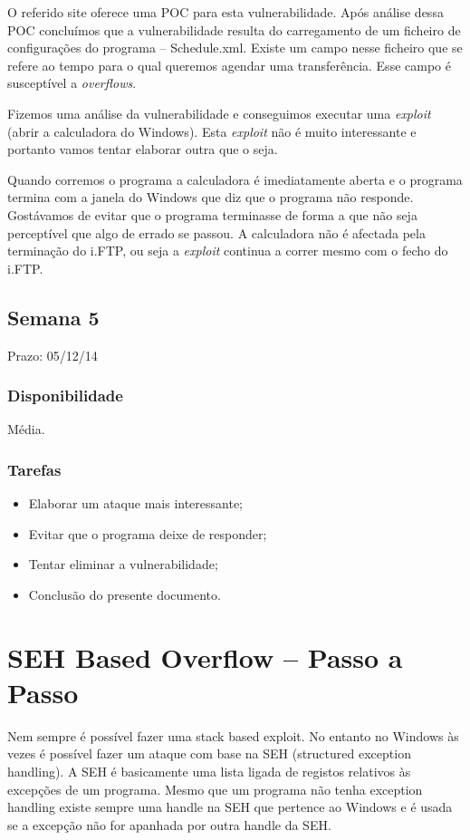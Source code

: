 \documentclass[a4paper]{article}
\begin{document}
O referido site oferece uma POC para esta vulnerabilidade. Após análise dessa POC concluímos que a vulnerabilidade resulta do carregamento de um ficheiro de configurações do programa -- Schedule.xml. Existe um campo nesse ficheiro que se refere ao tempo para o qual queremos agendar uma transferência. Esse campo é susceptível a \textit{overflows}.

Fizemos uma análise da vulnerabilidade e conseguimos executar uma \textit{exploit} (abrir a calculadora do Windows). Esta \textit{exploit} não é muito interessante e portanto vamos tentar elaborar outra que o seja.

Quando corremos o programa a calculadora é imediatamente aberta e o programa termina com a janela do Windows que diz que o programa não responde. Gostávamos de evitar que o programa terminasse de forma a que não seja perceptível que algo de errado se passou. A calculadora não é afectada pela terminação do i.FTP, ou seja a \textit{exploit} continua a correr mesmo com o fecho do i.FTP.


\subsection{Semana 5}
Prazo: 05/12/14
\subsubsection{Disponibilidade}
Média.
\subsubsection{Tarefas}
\begin{itemize}
	\item Elaborar um ataque mais interessante;
	\item Evitar que o programa deixe de responder;
	\item Tentar eliminar a vulnerabilidade;
	\item Conclusão do presente documento.
\end{itemize}


\section{SEH Based Overflow -- Passo a Passo}

Nem sempre é possível fazer uma stack based exploit. No entanto no Windows às vezes é possível fazer um ataque com base na SEH (structured exception handling). A SEH é basicamente uma lista ligada de registos relativos às excepções de um programa. Mesmo que um programa não tenha exception handling existe sempre uma handle na SEH que pertence ao Windows e é usada se a excepção não for apanhada por outra handle da SEH.
\end{document}
